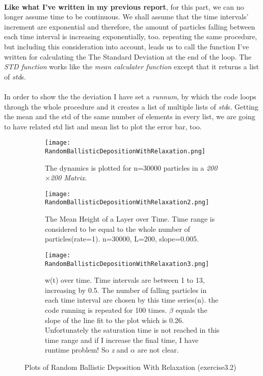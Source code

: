 \documentclass[12pt]{article}
\begin{document}
\paragraph*{} \textbf{Like what I've written in my previous report}, for this part, we can no longer assume time to be continuous. We shall assume that the time intervals' increment are exponential and therefore, the amount of particles falling between each time interval is increasing exponentially, too. repeating the same procedure, but including this consideration into account, leads us to call the function I've written for calculating the The Standard Deviation at the end of the loop. The \textit{STD function} works like the \textit{mean\underline{\hspace{.08in}} calculater function} except that it returns a list of \textit{std}s.
\paragraph*{} In order to show the the deviation I have set a \textit{run\underline{\hspace{.05in}}num}, by which the code loops through the whole procedure and it creates a list of multiple lists of \textit{std}s. Getting the mean and the std of the same number of elements in every list, we are going to have related std list and mean list to plot the error bar, too. 
\begin{figure}[H]
\centering
	\begin{subfigure}[t]{0.8\textwidth}
		\texttt{[image: RandomBallisticDepositionWithRelaxation.png]}
		\label{fig:mesh1.1}
		\caption{The dynamics is plotted for n=30000 particles in a \textit{200$\times$200 Matrix}.}
	\end{subfigure}
	\begin{subfigure}[t]{0.45\textwidth}
		\texttt{[image: RandomBallisticDepositionWithRelaxation2.png]}
		\label{fig:mesh1.2}
		\caption{The Mean Height of a Layer over Time. Time range is considered to be equal to the whole number of particles(rate=1). n=30000, L=200, slope=0.005. }
	\end{subfigure}\hfill
	\begin{subfigure}[t]{0.45\textwidth}
		\texttt{[image: RandomBallisticDepositionWithRelaxation3.png]}
		\label{fig:mesh1.3}
		\caption{w(t) over time. Time intervals are between 1 to 13, increasing by 0.5. The number of falling particles in each time interval are chosen by this time series(n). the code running is repeated for 100 times. $\beta$ equals the slope of the line fit to the plot which is 0.26. Unfortunately the saturation time is not reached in this time range and if I increase the final time, I have runtime problem! So \textit{z} and $\alpha$ are not clear. }
	\end{subfigure}
	\label{fig:mesh1}
	\caption{Plots of Random Ballistic Deposition With Relaxation (exercise3.2)}
\end{figure}
\end{document}
